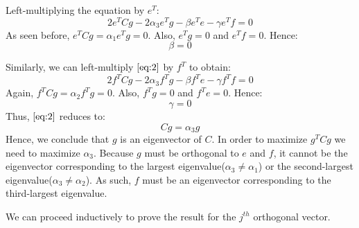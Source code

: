 \documentclass[a4paper]{article}
\begin{document}
Left-multiplying the equation by $e^{T}$:
\[2e^{T}Cg - 2\alpha_{3}e^{T}g - \beta e^{T}e - \gamma e^{T}f = 0\]
As seen before, $e^{T}Cg = \alpha_{1}e^{T}g = 0$. Also, $e^{T}g = 0$ and $e^{T}f = 0$. Hence:
\[\beta = 0\]

Similarly, we can left-multiply  $\eqref{eq:2}$ by $f^{T}$ to obtain:
\[2f^{T}Cg - 2\alpha_{3}f^{T}g - \beta f^{T}e - \gamma f^{T}f = 0\]
Again, $f^{T}Cg = \alpha_{2}f^{T}g = 0$. Also, $f^{T}g = 0$ and $f^{T}e = 0$. Hence:
\[\gamma = 0\]
Thus, $\eqref{eq:2}$ reduces to:
\[Cg = \alpha_{3}g\]
Hence, we conclude that $g$ is an eigenvector of $C$. In order to maximize $g^{T}Cg$ we need to maximize $\alpha_3$. Because $g$ must be orthogonal to $e$ and $f$, it cannot be the eigenvector corresponding to the largest eigenvalue($\alpha_{3} \neq \alpha_{1}$) or the second-largest eigenvalue($\alpha_{3} \neq \alpha_{2}$). As such, $f$ must be an eigenvector corresponding to the third-largest eigenvalue.

\medskip

We can proceed inductively to prove the result for the $j^{th}$ orthogonal vector.
\end{document}
